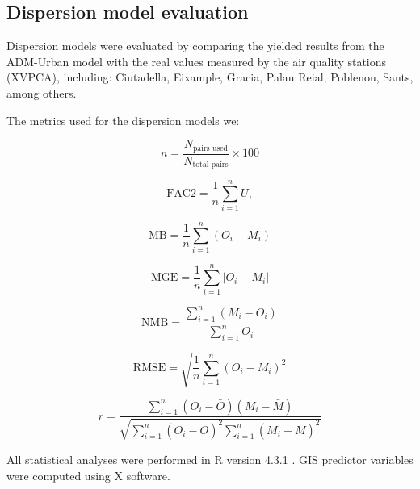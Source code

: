 \documentclass{article}
\begin{document}
\subsection{Dispersion model evaluation}
Dispersion models were evaluated by comparing the yielded results from the ADM-Urban model with the real values measured by the air quality stations (XVPCA), including: Ciutadella, Eixample, Gracia, Palau Reial, Poblenou, Sants, among others.\vspace{0.5cm}

The metrics used for the dispersion models we:

\begin{equation}
n = \frac{N_{\text{pairs used}}}{N_{\text{total pairs}}} \times 100
\end{equation}

\begin{equation}
\text{FAC2} = \frac{1}{n} \sum_{i=1}^{n} U,
\end{equation}

\begin{equation}
\text{MB} = \frac{1}{n} \sum_{i=1}^{n} (O_i - M_i)
\end{equation}

\begin{equation}
\text{MGE} = \frac{1}{n} \sum_{i=1}^{n} |O_i - M_i|
\end{equation}

\begin{equation}
\text{NMB} = \frac{\sum_{i=1}^{n} (M_i - O_i)}{\sum_{i=1}^{n} O_i}
\end{equation}

\begin{equation}
\text{RMSE} = \sqrt{\frac{1}{n} \sum_{i=1}^{n} (O_i - M_i)^2}
\end{equation}

\begin{equation}
r = \frac{\sum_{i=1}^{n} (O_i - \bar{O})(M_i - \bar{M})}{\sqrt{\sum_{i=1}^{n} (O_i - \bar{O})^2 \sum_{i=1}^{n} (M_i - \bar{M})^2}}
\end{equation}
\vspace{0.5cm}

All statistical analyses were performed in R version 4.3.1 \cite{Rstudio}. GIS predictor variables were computed using X software. 
\end{document}
